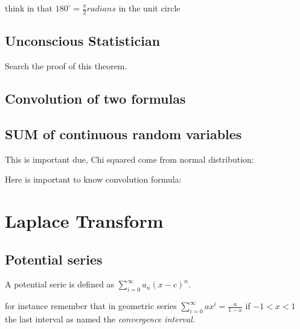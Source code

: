 \documentclass[10pt,a4paper]{article}
\begin{document}
think in that $180 ^{\circ} = \frac{\pi}{2} radians $ 
in the unit circle 




\subsection{Unconscious Statistician}
Search the proof of this theorem.




\subsection{Convolution of two formulas}










\subsection{SUM of continuous random variables}

This is important due, Chi squared come from normal distribution:



Here is important to know convolution formula:






\section{Laplace Transform}

\subsection{Potential series}
A potential serie is defined as
$ \sum_{i=0}^{\infty} a_{n}(x-c)^{n}$.

for instance remember that in geometric series $ \sum_{i=0}^{\infty} ax^{i} = \frac{a}{1-x}$ if $-1<x<1$ the last interval as named the \textit{convergence interval.}
\end{document}

